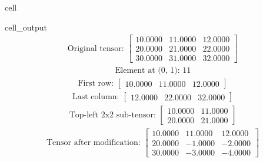 \documentclass[letterpaper,10pt,english]{jupyterBook}
\begin{document}
\begin{sphinxuseclass}{cell}
\begin{sphinxVerbatimOutput}
\begin{sphinxuseclass}{cell_output}\begin{equation*}
\begin{split}\displaystyle \text{Original tensor: }\left[
\begin{array}{}
  10.0000 &  11.0000 &  12.0000\\
  20.0000 &  21.0000 &  22.0000\\
  30.0000 &  31.0000 &  32.0000
\end{array}
\right]\end{split}
\end{equation*}\begin{equation*}
\begin{split}\displaystyle \text{Element at (0, 1): }11\end{split}
\end{equation*}\begin{equation*}
\begin{split}\displaystyle \text{First row: }\left[
\begin{array}{}
  10.0000 &  11.0000 &  12.0000
\end{array}
\right]\end{split}
\end{equation*}\begin{equation*}
\begin{split}\displaystyle \text{Last column: }\left[
\begin{array}{}
  12.0000 &  22.0000 &  32.0000
\end{array}
\right]\end{split}
\end{equation*}\begin{equation*}
\begin{split}\displaystyle \text{Top-left 2x2 sub-tensor: }\left[
\begin{array}{}
  10.0000 &  11.0000\\
  20.0000 &  21.0000
\end{array}
\right]\end{split}
\end{equation*}\begin{equation*}
\begin{split}\displaystyle \text{Tensor after modification: }\left[
\begin{array}{}
  10.0000 &  11.0000 &  12.0000\\
  20.0000 & -1.0000 & -2.0000\\
  30.0000 & -3.0000 & -4.0000
\end{array}
\right]\end{split}
\end{equation*}
\end{sphinxuseclass}\end{sphinxVerbatimOutput}

\end{sphinxuseclass}
\end{document}
